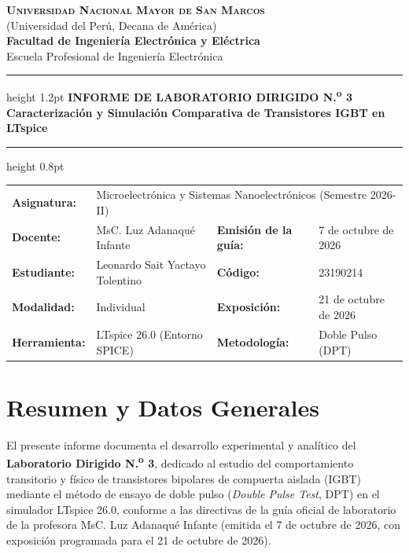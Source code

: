 \documentclass[11pt,a4paper]{article}
\begin{document}
\begin{center}
  {\large\scshape\bfseries Universidad Nacional Mayor de San Marcos}\\[1pt]
  {\small (Universidad del Perú, Decana de América)}\\[1pt]
  {\normalsize\bfseries Facultad de Ingeniería Electrónica y Eléctrica}\\[2pt]
  {\footnotesize Escuela Profesional de Ingeniería Electrónica}\\[5pt]
  \hrule height 1.2pt \vspace{4pt}
  {\Large\bfseries\color{navy} INFORME DE LABORATORIO DIRIGIDO N.\textsuperscript{o} 3}\\[3pt]
  {\large\bfseries\color{coral} Caracterización y Simulación Comparativa de Transistores IGBT en LTspice}\\[4pt]
  \hrule height 0.8pt \vspace{6pt}
  
  \begin{tabular}{@{}p{2.3cm} p{5.6cm} p{4.9cm} p{4.5cm}@{}}
    \textbf{Asignatura:} & \multicolumn{3}{l}{Microelectrónica y Sistemas Nanoelectrónicos (Semestre 2026-II)} \\
    \textbf{Docente:} & MsC. Luz Adanaqué Infante & \textbf{Emisión de la guía:} & 7 de octubre de 2026 \\
    \textbf{Estudiante:} & Leonardo Sait Yactayo Tolentino & \textbf{Código:} & 23190214 \\
    \textbf{Modalidad:} & Individual & \textbf{Exposición:} & 21 de octubre de 2026 \\
    \textbf{Herramienta:} & LTspice 26.0 (Entorno SPICE) & \textbf{Metodología:} & Doble Pulso (DPT) \\
  \end{tabular}
\end{center}

\vspace{-4pt}

\section{Resumen y Datos Generales}
El presente informe documenta el desarrollo experimental y analítico del \textbf{Laboratorio Dirigido N.\textsuperscript{o} 3}, dedicado al estudio del comportamiento transitorio y físico de transistores bipolares de compuerta aislada (IGBT) mediante el método de ensayo de doble pulso (\textit{Double Pulse Test}, DPT) en el simulador LTspice 26.0, conforme a las directivas de la guía oficial de laboratorio de la profesora MsC. Luz Adanaqué Infante (emitida el 7 de octubre de 2026, con exposición programada para el 21 de octubre de 2026).
\end{document}
